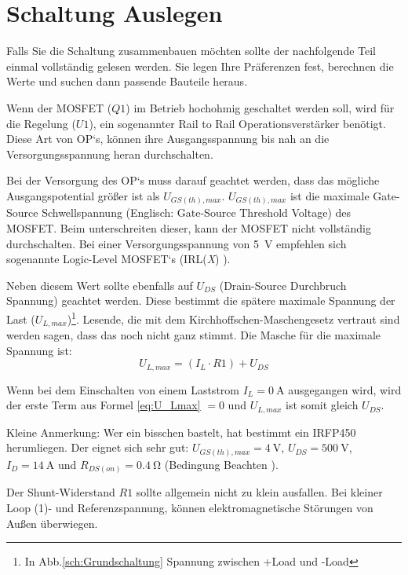 \section{Schaltung Auslegen}

Falls Sie die Schaltung zusammenbauen möchten sollte der nachfolgende Teil einmal vollständig gelesen werden.
Sie legen Ihre Präferenzen fest, berechnen die Werte und suchen dann passende Bauteile heraus.
\newline

Wenn der MOSFET ($Q1$) im Betrieb hochohmig geschaltet werden soll, wird für die Regelung ($U1$), 
ein sogenannter Rail to Rail Operationsverstärker benötigt. 
Diese Art von OP`s, können ihre Ausgangsspannung bis nah an die Versorgungsspannung heran durchschalten.

Bei der Versorgung des OP`s muss darauf geachtet werden, dass das mögliche Ausgangspotential größer ist als $U_{GS(th),max}$.
$U_{GS(th),max}$ ist die maximale Gate-Source Schwellspannung (Englisch: Gate-Source Threshold Voltage) des MOSFET. 
Beim unterschreiten dieser, kann der MOSFET nicht vollständig durchschalten.
Bei einer Versorgungsspannung von \SI{5}{\volt} empfehlen sich sogenannte Logic-Level MOSFET`s 
(IRL(\textit{X}) \cite{LL_MOSFET}).

Neben diesem Wert sollte ebenfalls auf $U_{DS}$ (Drain-Source Durchbruch Spannung) geachtet werden. Diese bestimmt die 
spätere maximale Spannung der Last ($U_{L,max}$)\footnote{In Abb.\ref{sch:Grundschaltung} Spannung zwischen +Load und -Load}. 
Lesende, die mit dem Kirchhoffschen-Maschengesetz vertraut sind werden sagen, dass das noch nicht ganz stimmt.
Die Masche für die maximale Spannung ist:
\begin{equation}
	U_{L,max} = (I_{L} \cdot R1) + U_{DS}
	\label{eq:U_Lmax}
\end{equation}

Wenn bei dem Einschalten von einem Laststrom $I_{L} = \SI{0}{\ampere}$ ausgegangen wird, wird der erste Term aus Formel \ref {eq:U_Lmax} 
$= 0$ und $U_{L,max}$ ist somit gleich $U_{DS}$. 


Kleine Anmerkung: Wer ein bisschen bastelt, hat bestimmt ein IRFP450 \cite{IRFP450} herumliegen. 
Der eignet sich sehr gut: $U_{GS(th),max} = \SI{4}{\volt}$, $U_{DS} = \SI{500}{\volt}$, $I_{D} = \SI{14}{\ampere}$ 
und $R_{DS(on)} = \SI{0,4}{\ohm}$ (Bedingung Beachten \cite{IRFP450}).

Der Shunt-Widerstand $R1$ sollte allgemein nicht zu klein ausfallen.
Bei kleiner Loop (1)- und Referenzspannung, können elektromagnetische Störungen von Außen überwiegen.

